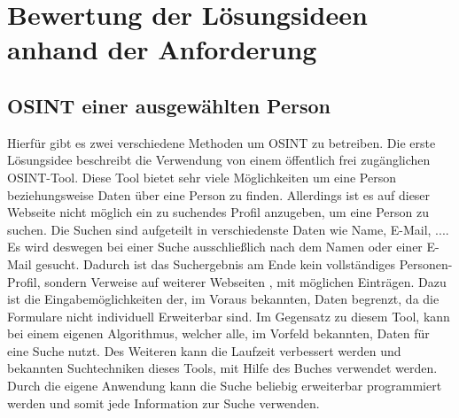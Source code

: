 

\chapter{Bewertung der Lösungsideen anhand der Anforderung}  %
\label{cha:BewertungLösungsideenAnhandAnforderung} %

\section{OSINT einer ausgewählten Person}
Hierfür gibt es zwei verschiedene Methoden um OSINT zu betreiben. Die erste Lösungsidee beschreibt die Verwendung von einem öffentlich frei zugänglichen OSINT-Tool. Diese Tool bietet sehr viele Möglichkeiten um eine Person beziehungsweise Daten über eine Person zu finden. Allerdings ist es auf dieser Webseite nicht möglich ein zu suchendes Profil anzugeben, um eine Person zu suchen. Die Suchen sind aufgeteilt in verschiedenste Daten wie Name, E-Mail, .... Es wird deswegen bei einer Suche ausschließlich nach dem Namen oder einer E-Mail gesucht. Dadurch ist das Suchergebnis am Ende kein vollständiges Personen-Profil, sondern Verweise auf weiterer Webseiten , mit möglichen Einträgen. Dazu ist die Eingabemöglichkeiten der, im Voraus bekannten, Daten begrenzt, da die Formulare nicht individuell Erweiterbar sind.
Im Gegensatz zu diesem Tool, kann bei einem eigenen Algorithmus, welcher alle, im Vorfeld bekannten, Daten für eine Suche nutzt. Des Weiteren kann die Laufzeit verbessert werden und bekannten Suchtechniken dieses Tools, mit Hilfe des Buches \cite{Bazzell} verwendet werden. Durch die eigene Anwendung kann die Suche beliebig erweiterbar programmiert werden und somit jede Information zur Suche verwenden.

